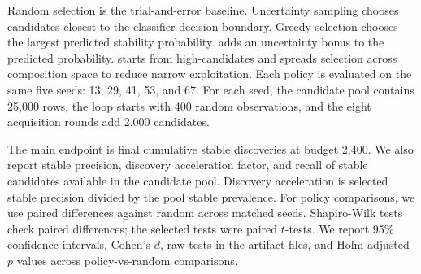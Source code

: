 Random selection is the trial-and-error baseline. Uncertainty sampling chooses candidates closest to the classifier decision boundary. Greedy selection chooses the largest predicted stability probability. \ucb adds an uncertainty bonus to the predicted probability. \diverseucb starts from high-\ucb candidates and spreads selection across composition space to reduce narrow exploitation. Each policy is evaluated on the same five seeds: 13, 29, 41, 53, and 67. For each seed, the candidate pool contains 25,000 \mpdata rows, the loop starts with 400 random observations, and the eight acquisition rounds add 2,000 candidates.

The main endpoint is final cumulative stable discoveries at budget 2,400. We also report stable precision, discovery acceleration factor, and recall of stable candidates available in the candidate pool. Discovery acceleration is selected stable precision divided by the pool stable prevalence. For policy comparisons, we use paired differences against random across matched seeds. Shapiro-Wilk tests check paired differences; the selected tests were paired $t$-tests. We report 95\% confidence intervals, Cohen's $d$, raw tests in the artifact files, and Holm-adjusted $p$ values across policy-vs-random comparisons.
